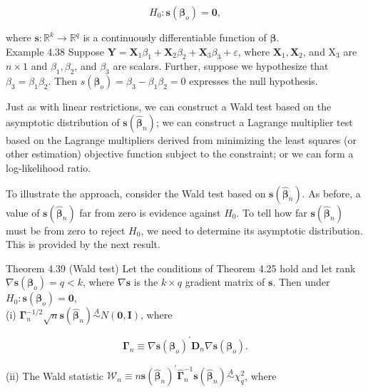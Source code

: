 \documentclass[10pt]{article}
\begin{document}
$$
H_{0}: \mathbf{s}\left(\boldsymbol{\beta}_{o}\right)=\mathbf{0},
$$

where $\mathbf{s}: \mathbb{R}^{k} \rightarrow \mathbb{R}^{q}$ is a continuously differentiable function of $\boldsymbol{\beta}$.\\
Example 4.38 Suppose $\mathbf{Y}=\mathbf{X}_{1} \beta_{1}+\mathbf{X}_{2} \beta_{2}+\mathbf{X}_{3} \beta_{3}+\varepsilon$, where $\mathbf{X}_{1}, \mathbf{X}_{2}$, and $\mathrm{X}_{3}$ are $n \times 1$ and $\beta_{1}, \beta_{2}$, and $\beta_{3}$ are scalars. Further, suppose we hypothesize that $\beta_{3}=\beta_{1} \beta_{2}$. Then $s\left(\boldsymbol{\beta}_{o}\right)=\beta_{3}-\beta_{1} \beta_{2}=0$ expresses the null hypothesis.

Just as with linear restrictions, we can construct a Wald test based on the asymptotic distribution of $\mathbf{s}\left(\hat{\boldsymbol{\beta}}_{n}\right)$; we can construct a Lagrange multiplier test based on the Lagrange multipliers derived from minimizing the least squares (or other estimation) objective function subject to the constraint; or we can form a log-likelihood ratio.

To illustrate the approach, consider the Wald test based on $\mathbf{s}\left(\hat{\boldsymbol{\beta}}_{n}\right)$. As before, a value of $\mathbf{s}\left(\hat{\boldsymbol{\beta}}_{n}\right)$ far from zero is evidence against $H_{0}$. To tell how far $\mathbf{s}\left(\hat{\boldsymbol{\beta}}_{n}\right)$ must be from zero to reject $H_{0}$, we need to determine its asymptotic distribution. This is provided by the next result.

Theorem 4.39 (Wald test) Let the conditions of Theorem 4.25 hold and let rank $\nabla \mathbf{s}\left(\boldsymbol{\beta}_{o}\right)=q<k$, where $\nabla \mathbf{s}$ is the $k \times q$ gradient matrix of $\mathbf{s}$. Then under $H_{0}: \mathbf{s}\left(\boldsymbol{\beta}_{o}\right)=\mathbf{0}$,\\
(i) $\boldsymbol{\Gamma}_{n}^{-1 / 2} \sqrt{n} \mathbf{s}\left(\hat{\boldsymbol{\beta}}_{n}\right) \stackrel{A}{\sim} N(\mathbf{0}, \mathbf{I})$, where

$$
\boldsymbol{\Gamma}_{n} \equiv \nabla \mathbf{s}\left(\boldsymbol{\beta}_{o}\right)^{\prime} \mathbf{D}_{n} \nabla \mathbf{s}\left(\boldsymbol{\beta}_{o}\right) .
$$

(ii) The Wald statistic $\mathcal{W}_{n} \equiv n \mathbf{s}\left(\hat{\boldsymbol{\beta}}_{n}\right)^{\prime} \hat{\boldsymbol{\Gamma}}_{n}^{-1} \mathbf{s}\left(\hat{\boldsymbol{\beta}}_{n}\right) \stackrel{A}{\sim} \chi_{q}^{2}$, where
\end{document}
